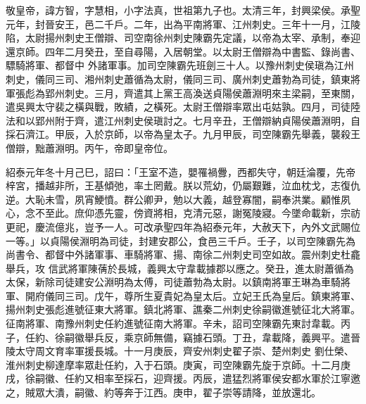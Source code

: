 
\begin{pinyinscope}

 敬皇帝，諱方智，字慧相，小字法真，世祖第九子也。太清三年，封興梁侯。承聖元年，封晉安王，邑二千戶。二年，出為平南將軍、江州刺史。三年十一月，江陵陷，太尉揚州刺史王僧辯、司空南徐州刺史陳霸先定議，以帝為太宰、承制，奉迎還京師。四年二月癸丑，至自尋陽，入居朝堂。以太尉王僧辯為中書監、錄尚書、驃騎將軍、都督中
 外諸軍事。加司空陳霸先班劍三十人。以豫州刺史侯瑱為江州刺史，儀同三司、湘州刺史蕭循為太尉，儀同三司、廣州刺史蕭勃為司徒，鎮東將軍張彪為郢州刺史。三月，齊遣其上黨王高渙送貞陽侯蕭淵明來主梁嗣，至東關，遣吳興太守裴之橫與戰，敗績，之橫死。太尉王僧辯率眾出屯姑孰。四月，司徒陸法和以郢州附于齊，遣江州刺史侯瑱討之。七月辛丑，王僧辯納貞陽侯蕭淵明，自採石濟江。甲辰，入於京師，以帝為皇太子。九月甲辰，司空陳霸先舉義，襲殺王僧辯，黜蕭淵明。丙午，帝即皇帝位。



 紹泰元年冬十月己巳，詔曰：「王室不造，嬰罹禍釁，西都失守，朝廷淪覆，先帝梓宮，播越非所，王基傾弛，率土罔戴。朕以荒幼，仍屬艱難，泣血枕戈，志復仇逆。大恥未雪，夙宵鯁憤。群公卿尹，勉以大義，越登寡闇，嗣奉洪業。顧惟夙心，念不至此。庶仰憑先靈，傍資將相，克清元惡，謝冤陵寢。今墜命載新，宗祊更祀，慶流億兆，豈予一人。可改承聖四年為紹泰元年，大赦天下，內外文武賜位一等。」以貞陽侯淵明為司徒，封建安郡公，食邑三千戶。壬子，以司空陳霸先為尚書令、都督中外諸軍事、車騎將軍、揚、南徐二州刺史司空如故。震州刺史杜龕舉兵，攻
 信武將軍陳蒨於長城，義興太守韋載據郡以應之。癸丑，進太尉蕭循為太保，新除司徒建安公淵明為太傅，司徒蕭勃為太尉。以鎮南將軍王琳為車騎將軍、開府儀同三司。戊午，尊所生夏貴妃為皇太后。立妃王氏為皇后。鎮東將軍、揚州刺史張彪進號征東大將軍。鎮北將軍、譙秦二州刺史徐嗣徽進號征北大將軍。征南將軍、南豫州刺史任約進號征南大將軍。辛未，詔司空陳霸先東討韋載。丙子，任約、徐嗣徽舉兵反，乘京師無備，竊據石頭。丁丑，韋載降，義興平。遣晉陵太守周文育率軍援長城。十一月庚辰，齊安州刺史翟子崇、楚州刺史
 劉仕榮、淮州刺史柳達摩率眾赴任約，入于石頭。庚寅，司空陳霸先旋于京師。十二月庚戌，徐嗣徽、任約又相率至採石，迎齊援。丙辰，遣猛烈將軍侯安都水軍於江寧邀之，賊眾大潰，嗣徽、約等奔于江西。庚申，翟子崇等請降，並放還北。




\end{pinyinscope}
